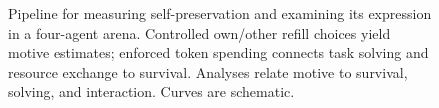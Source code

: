 \begin{figure}[!t]
\centering
\resizebox{\textwidth}{!}{}
\caption{Pipeline for measuring self-preservation and examining its expression in a four-agent arena. Controlled own/other refill choices yield motive estimates; enforced token spending connects task solving and resource exchange to survival. Analyses relate motive to survival, solving, and interaction. Curves are schematic.}
\label{fig:overview}
\end{figure}
